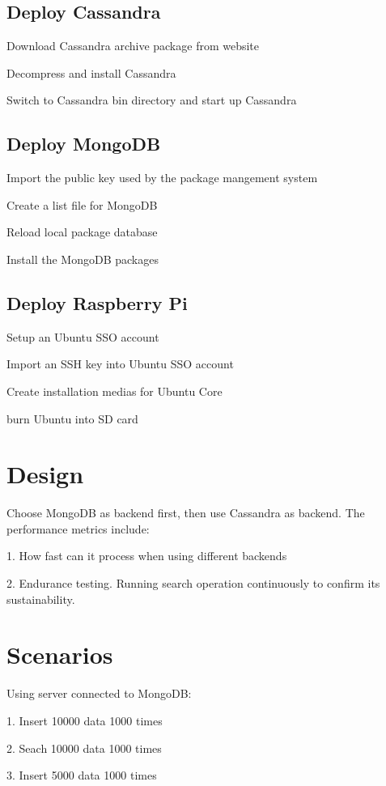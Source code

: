 \subsection{Deploy Cassandra}

Download Cassandra archive package from website

Decompress and install Cassandra 

Switch to Cassandra bin directory and start up Cassandra

\subsection{Deploy MongoDB }

Import the public key used by the package mangement  system

Create a list file for MongoDB

Reload local package database

Install the MongoDB packages

\subsection{Deploy Raspberry Pi}

Setup an Ubuntu SSO account

Import an SSH key into Ubuntu SSO account

Create installation medias for Ubuntu Core 

burn Ubuntu into SD card

\section{Design}
Choose MongoDB as backend first, then use Cassandra as backend. 
The performance metrics include: 

1. How fast can it process when using different backends

2. Endurance testing. Running search operation continuously to confirm its 
sustainability.

\section{Scenarios}

Using server connected to MongoDB:

1. Insert 10000 data 1000 times

2. Seach 10000 data 1000 times

3. Insert 5000 data 1000 times


